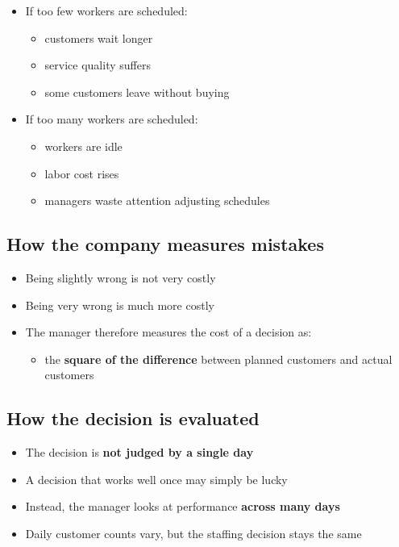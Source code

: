 \documentclass[
  12pt,
  letterpaper,
  DIV=11,
  numbers=noendperiod]{scrreprt}
\providecommand{\tightlist}{%
  \setlength{\itemsep}{0pt}\setlength{\parskip}{0pt}}
\begin{document}
\begin{itemize}
\item
  If too few workers are scheduled:

  \begin{itemize}
  \tightlist
  \item
    customers wait longer
  \item
    service quality suffers
  \item
    some customers leave without buying
  \end{itemize}
\item
  If too many workers are scheduled:

  \begin{itemize}
  \tightlist
  \item
    workers are idle
  \item
    labor cost rises
  \item
    managers waste attention adjusting schedules
  \end{itemize}
\end{itemize}

\subsection{How the company measures
mistakes}\label{how-the-company-measures-mistakes}

\begin{itemize}
\item
  Being slightly wrong is not very costly
\item
  Being very wrong is much more costly
\item
  The manager therefore measures the cost of a decision as:

  \begin{itemize}
  \tightlist
  \item
    the \textbf{square of the difference} between planned customers and
    actual customers
  \end{itemize}
\end{itemize}

\subsection{How the decision is
evaluated}\label{how-the-decision-is-evaluated}

\begin{itemize}
\tightlist
\item
  The decision is \textbf{not judged by a single day}
\item
  A decision that works well once may simply be lucky
\item
  Instead, the manager looks at performance \textbf{across many days}
\item
  Daily customer counts vary, but the staffing decision stays the same
\end{itemize}
\end{document}
